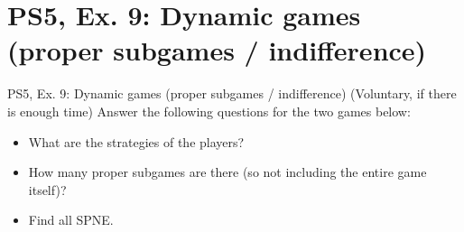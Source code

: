 \section{PS5, Ex. 9: Dynamic games (proper subgames / indifference)}

\begin{frame}{PS5, Ex. 9: Dynamic games (proper subgames / indifference)}
  (Voluntary, if there is enough time) Answer the following questions for the two games below:
  \begin{itemize}
    \item What are the strategies of the players?
    \item How many proper subgames are there (so not including the entire game itself)?
    \item Find all SPNE.
  \end{itemize}
\end{frame}

